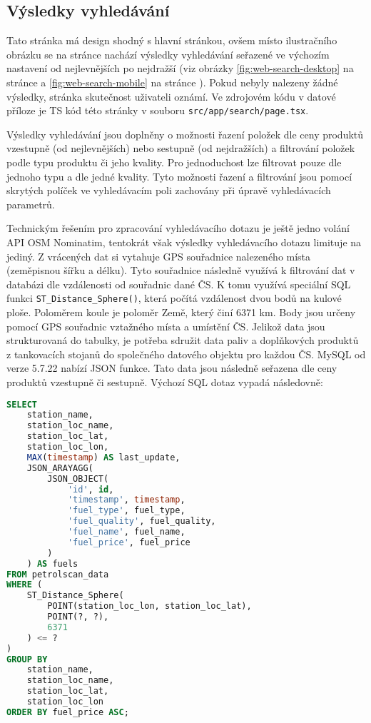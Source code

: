 \subsection{Výsledky vyhledávání}
\label{sec:search-results}

Tato stránka má design shodný s hlavní stránkou, ovšem místo ilustračního
obrázku se na stránce nachází výsledky vyhledávání seřazené ve výchozím
nastavení od nejlevnějších po nejdražší (viz obrázky
\ref{fig:web-search-desktop} na stránce \pageref{fig:web-search-desktop}
a \ref{fig:web-search-mobile} na stránce \pageref{fig:web-search-mobile}).
Pokud nebyly nalezeny žádné výsledky, stránka skutečnost uživateli
oznámí. Ve zdrojovém kódu v datové příloze je TS kód této stránky v souboru
\texttt{src/app/search/page.tsx}.

Výsledky vyhledávání jsou doplněny o možnosti řazení položek dle ceny produktů
vzestupně (od nejlevnějších) nebo sestupně (od nejdražších) a filtrování
položek podle typu produktu či jeho kvality. Pro jednoduchost lze filtrovat
pouze dle jednoho typu a dle jedné kvality. Tyto možnosti řazení a filtrování
jsou pomocí skrytých políček ve vyhledávacím poli zachovány při úpravě
vyhledávacích parametrů.

Technickým řešením pro zpracování vyhledávacího dotazu je ještě jedno volání
API OSM Nominatim, tentokrát však výsledky vyhledávacího dotazu limituje
na jediný. Z vrácených dat si vytahuje GPS souřadnice nalezeného místa
(zeměpisnou šířku a délku). Tyto souřadnice následně využívá k filtrování
dat v databázi dle vzdálenosti od souřadnic dané ČS. K tomu využívá speciální
SQL funkci \texttt{ST\_Distance\_Sphere()}, která počítá vzdálenost dvou bodů
na kulové ploše. Poloměrem koule je poloměr Země, který činí 6371 km.
Body jsou určeny pomocí GPS souřadnic vztažného místa a umístění ČS. Jelikož
data jsou strukturovaná do tabulky, je potřeba sdružit data paliv a doplňkových
produktů z tankovacích stojanů do společného datového objektu pro každou ČS.
MySQL od verze 5.7.22 nabízí JSON funkce. Tato data jsou následně seřazena dle
ceny produktů vzestupně či sestupně. Výchozí SQL dotaz vypadá následovně:

\begin{lstlisting}[label=lst:default-sql-query,caption={SQL dotaz srovnávače cen},language=sql]
SELECT
    station_name,
    station_loc_name,
    station_loc_lat,
    station_loc_lon,
    MAX(timestamp) AS last_update,
    JSON_ARAYAGG(
        JSON_OBJECT(
            'id', id,
            'timestamp', timestamp,
            'fuel_type', fuel_type,
            'fuel_quality', fuel_quality,
            'fuel_name', fuel_name,
            'fuel_price', fuel_price
        )
    ) AS fuels
FROM petrolscan_data
WHERE (
    ST_Distance_Sphere(
        POINT(station_loc_lon, station_loc_lat),
        POINT(?, ?),
        6371
    ) <= ?
)
GROUP BY
    station_name,
    station_loc_name,
    station_loc_lat,
    station_loc_lon
ORDER BY fuel_price ASC;
\end{lstlisting}

